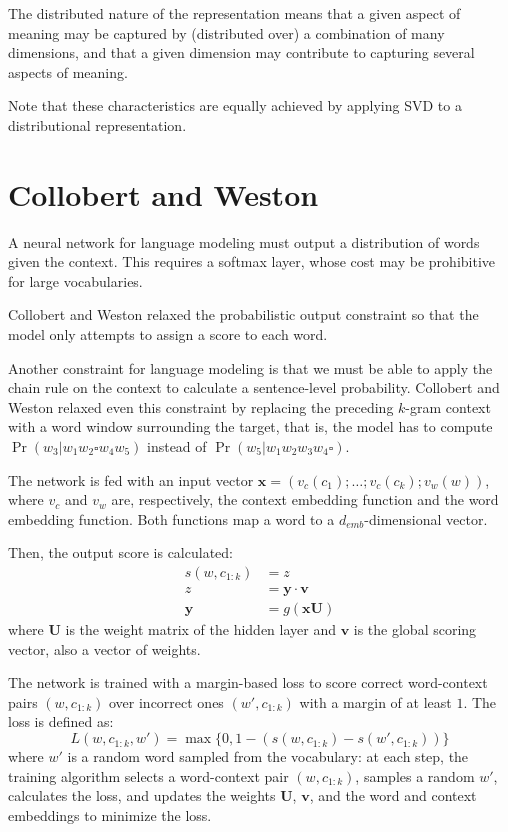 The distributed nature of the representation means that a given aspect of meaning may be captured by (distributed over) a combination of many dimensions, and that a given dimension may contribute to capturing several aspects of meaning.

Note that these characteristics are equally achieved by applying SVD to a distributional representation.

\section{Collobert and Weston}
A neural network for language modeling must output a distribution of words given the context. This requires a softmax layer, whose cost may be prohibitive for large vocabularies.

Collobert and Weston relaxed the probabilistic output constraint so that the model only attempts to assign a score to each word.

Another constraint for language modeling is that we must be able to apply the chain rule on the context to calculate a sentence-level probability. Collobert and Weston relaxed even this constraint by replacing the preceding $k$-gram context with a word window surrounding the target, that is, the model has to compute $\Pr(w_{3}|w_{1}w_{2}\square w_{4}w_{5})$ instead of $\Pr(w_{5}|w_{1}w_{2}w_{3}w_{4}\square)$.

The network is fed with an input vector $\mathbf{x}=(v_{c}(c_{1});\dots;v_{c}(c_{k});v_{w}(w))$, where $v_{c}$ and $v_{w}$ are, respectively, the context embedding function and the word embedding function. Both functions map a word to a $d_{emb}$-dimensional vector.

Then, the output score is calculated:
\[
\begin{aligned}
s(w, c_{1:k})&=z \\
z&=\mathbf{y} \cdot \mathbf{v} \\
\mathbf{y}&=g(\mathbf{x}\mathbf{U})
\end{aligned}
\]
where \(\mathbf{U}\) is the weight matrix of the hidden layer and \(\mathbf{v}\) is the global scoring vector, also a vector of weights.

The network is trained with a margin-based loss to score correct word-context pairs $(w, c_{1:k})$ over incorrect ones $(w', c_{1:k})$ with a margin of at least $1$. The loss is defined as:
\[
L(w, c_{1:k}, w')=\max\{0, 1 - (s(w,c_{1:k}) - s(w', c_{1:k}))\}
\]
where $w'$ is a random word sampled from the vocabulary: at each step, the training algorithm selects a word-context pair $(w, c_{1:k})$, samples a random $w'$, calculates the loss, and updates the weights $\mathbf{U}$, $\mathbf{v}$, and the word and context embeddings to minimize the loss.

